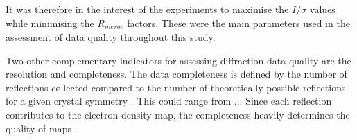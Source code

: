 It was therefore in the interest of the experiments to maximise the $I / \sigma$ values while minimising the $R_{merge}$ factors. These were the main parameters used in the assessment of data quality throughout this study.

Two other complementary indicators for assessing diffraction data quality are the resolution and completeness. The data completeness is defined by the number of reflections collected compared to the number of theoretically possible reflections for a given crystal symmetry \cite{Arkhipova2017}. This could range from ... Since each reflection contributes to the electron-density map, the completeness heavily determines the quality of maps \cite{Wlodawer2007}.



